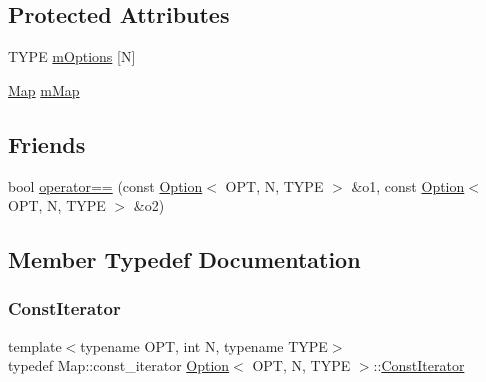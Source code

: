 \subsection*{Protected Attributes}
\begin{DoxyCompactItemize}
\item 
T\+Y\+PE \mbox{\hyperlink{class_option_a7fe66bd61ad037627149c6642b2c69f7}{m\+Options}} \mbox{[}N\mbox{]}
\item 
\mbox{\hyperlink{class_option_a4a16877e4cb71dc27ceb30aee15537c2}{Map}} \mbox{\hyperlink{class_option_a0242415a302a1b388209df29e0884ab1}{m\+Map}}
\end{DoxyCompactItemize}
\subsection*{Friends}
\begin{DoxyCompactItemize}
\item 
bool \mbox{\hyperlink{class_option_a5c48fb7f253cafa65692cc25bac18490}{operator==}} (const \mbox{\hyperlink{class_option}{Option}}$<$ O\+PT, N, T\+Y\+PE $>$ \&o1, const \mbox{\hyperlink{class_option}{Option}}$<$ O\+PT, N, T\+Y\+PE $>$ \&o2)
\end{DoxyCompactItemize}


\subsection{Member Typedef Documentation}
\mbox{\label{class_option_aaac736165c4115b84b0b857d48c3a61f}} 
\subsubsection{\texorpdfstring{ConstIterator}{ConstIterator}}
{\footnotesize\ttfamily template$<$typename O\+PT, int N, typename T\+Y\+PE$>$ \\
typedef Map\+::const\+\_\+iterator \mbox{\hyperlink{class_option}{Option}}$<$ O\+PT, N, T\+Y\+PE $>$\+::\mbox{\hyperlink{class_option_aaac736165c4115b84b0b857d48c3a61f}{Const\+Iterator}}\hspace{0.3cm}{\ttfamily [protected]}}

\mbox{\label{class_option_a04dc85c3f4d2672befc47c9f87f2af7d}} 
